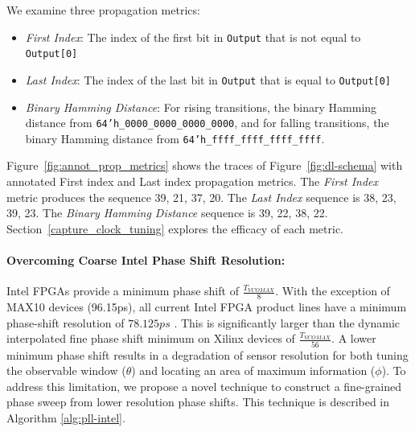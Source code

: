 

We examine three propagation metrics:
\begin{itemize}
    \item \textit{First Index}: The index of the first bit in \texttt{Output} that is not equal to \texttt{Output[0]}
    \item \textit{Last Index}: The index of the last bit in \texttt{Output} that is equal to \texttt{Output[0]}
    \item \textit{Binary Hamming Distance}: For rising transitions, the binary Hamming distance from \texttt{64'h\_0000\_0000\_0000\_0000}, and for falling transitions, the binary Hamming distance from \texttt{64'h\_ffff\_ffff\_ffff\_ffff}.
\end{itemize}

Figure~\ref{fig:annot_prop_metrics} shows the traces of Figure~\ref{fig:dl-schema} with annotated First index and Last index propagation metrics. The \textit{First Index} metric produces the sequence 39, 21, 37, 20. The \textit{Last Index} sequence is 38, 23, 39, 23. The \textit{Binary Hamming Distance} sequence is 39, 22, 38, 22. Section~\ref{capture_clock_tuning} explores the efficacy of each metric.



\paragraph{Overcoming Coarse Intel Phase Shift Resolution: }
Intel FPGAs provide a minimum phase shift of $\frac{T_{VCOMAX}}{8}$. With the exception of MAX10 devices (96.15ps), all current Intel FPGA product lines have a minimum phase-shift resolution of $78.125ps$ \cite{max10phase, aria10phase, stratix10phase, agilexphase, cvphase}. This is significantly larger than the dynamic interpolated fine phase shift minimum on Xilinx devices of $\frac{T_{VCOMAX}}{56}$. A lower minimum phase shift results in a degradation of sensor resolution for both tuning the observable window ($\theta$) and locating an area of maximum information ($\phi$). To address this limitation, we propose a novel technique to construct a fine-grained phase sweep from lower resolution phase shifts. This technique is described in Algorithm \ref{alg:pll-intel}. 

